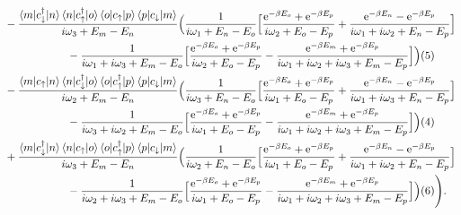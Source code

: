 \documentclass[12pt,a4paper]{scrartcl}
\numberwithin{equation}{section}
\renewcommand{\exp}[1]{\mathrm{e}^{#1}}
\begin{document}
\begin{align}
     &-
 \frac{\braket{m|c^{\dagger}_{\downarrow} |n}\braket{n|c^{\dagger}_{\uparrow} |o}\braket{o|c_{\uparrow} |p}\braket{p|c_{\downarrow} |m} }{i\omega_3 +E_m-E_n}
 \Big( \frac{1}{i\omega_1 +E_n-E_o}
 \Big[
 \frac{\exp{-\beta E_o}+\exp{-\beta E_p} }{i\omega_2 +E_o-E_p} 
  + \frac{ \exp{-\beta E_n} - \exp{-\beta E_p} }{ i\omega_1 + i\omega_2 + E_n- E_p } 
 \Big] \nonumber \\
 & \hspace*{2cm} -  \frac{1}{i\omega_1+ i\omega_3 + E_m-E_o}
 \Big[
  \frac{\exp{-\beta E_o}+\exp{-\beta E_p} }{i\omega_2 +E_o-E_p} 
 -  \frac{ \exp{-\beta E_m}+\exp{-\beta E_p} }{ i\omega_1 + i\omega_2 + i\omega_3 + E_m- E_p } 
 \Big]
 \Big) (5) \nonumber\\
     &-
 \frac{\braket{m|c_{\uparrow} |n}\braket{n|c^{\dagger}_{\downarrow} |o}\braket{o|c^{\dagger}_{\uparrow} |p}\braket{p| c_{\downarrow} |m}}{i\omega_2 +E_m-E_n}
 \Big( \frac{1}{i\omega_3 +E_n-E_o}
 \Big[
 \frac{\exp{-\beta E_o}+\exp{-\beta E_p} }{i\omega_1 +E_o-E_p} 
  + \frac{ \exp{-\beta E_n} - \exp{-\beta E_p} }{ i\omega_1 + i\omega_3 + E_n- E_p } 
 \Big] \nonumber \\
 & \hspace*{2cm} -  \frac{1}{i\omega_3+ i\omega_2 + E_m-E_o}
 \Big[
  \frac{\exp{-\beta E_o}+\exp{-\beta E_p} }{i\omega_1 +E_o-E_p} 
 -  \frac{ \exp{-\beta E_m}+\exp{-\beta E_p} }{ i\omega_1 + i\omega_2 + i\omega_3 + E_m- E_p } 
 \Big]
 \Big) (4) \nonumber\\
     &+
 \frac{\braket{m|c^{\dagger}_{\downarrow} |n}\braket{n|c_{\uparrow} |o}\braket{o|c^{\dagger}_{\uparrow} |p}\braket{p| c_{\downarrow} |m}}{i\omega_3 +E_m-E_n}
 \Big( \frac{1}{i\omega_2 +E_n-E_o}
 \Big[
 \frac{\exp{-\beta E_o}+\exp{-\beta E_p} }{i\omega_1 +E_o-E_p} 
  + \frac{ \exp{-\beta E_n} - \exp{-\beta E_p} }{ i\omega_1 + i\omega_2 + E_n- E_p } 
 \Big] \nonumber \\
 & \hspace*{2cm} -  \frac{1}{i\omega_2+ i\omega_3 + E_m-E_o}
 \Big[
  \frac{\exp{-\beta E_o}+\exp{-\beta E_p} }{i\omega_1 +E_o-E_p} 
 -  \frac{ \exp{-\beta E_m}+\exp{-\beta E_p} }{ i\omega_1 + i\omega_2 + i\omega_3 + E_m- E_p } 
 \Big]
 \Big) (6) \Bigg) \nonumber .
\end{align}
%


\clearpage

\end{document}

